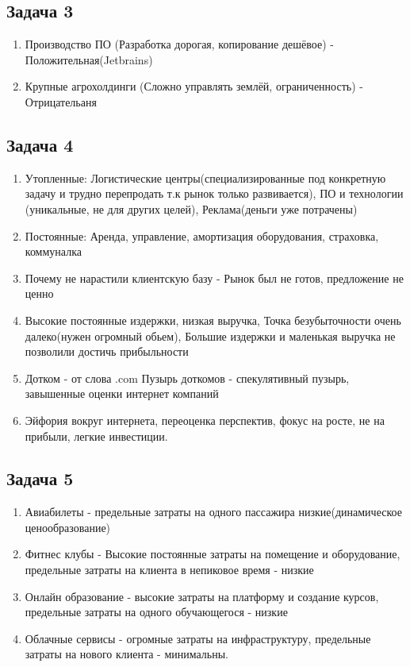 \documentclass[a4paper,12pt]{article}
\begin{document}
\subsection{Задача 3}
\begin{enumerate}
    \item Производство ПО (Разработка дорогая, копирование дешёвое) - Положительная(Jetbrains)
    \item Крупные агрохолдинги (Сложно управлять землёй, ограниченность) - Отрицательаня
\end{enumerate}

\subsection{Задача 4}
\begin{enumerate}
    \item Утопленные: Логистические центры(специализированные под конкретную задачу и трудно перепродать т.к рынок только развивается), ПО и технологии (уникальные, не для других целей), Реклама(деньги уже потрачены)
    \item Постоянные: Аренда, управление, амортизация оборудования, страховка, коммуналка
    \item Почему не нарастили клиентскую базу - Рынок был не готов, предложение не ценно
    \item Высокие постоянные издержки, низкая выручка, Точка безубыточности очень далеко(нужен огромный обьем), Большие издержки и маленькая выручка не позволили достичь прибыльности
    \item Дотком - от слова .com Пузырь доткомов - спекулятивный пузырь, завышенные оценки интернет компаний
    \item Эйфория вокруг интернета, переоценка перспектив, фокус на росте, не на прибыли, легкие инвестиции.
\end{enumerate}

\subsection{Задача 5}
\begin{enumerate}
    \item Авиабилеты - предельные затраты на одного пассажира низкие(динамическое ценообразование)
    \item Фитнес клубы - Высокие постоянные затраты на помещение и оборудование, предельные затраты на клиента в непиковое время - низкие
    \item Онлайн образование - высокие затраты на платформу и создание курсов, предельные затраты на одного обучающегося - низкие
    \item Облачные сервисы - огромные затраты на инфраструктуру, предельные затраты на нового клиента - минимальны.
\end{enumerate}
\end{document}
